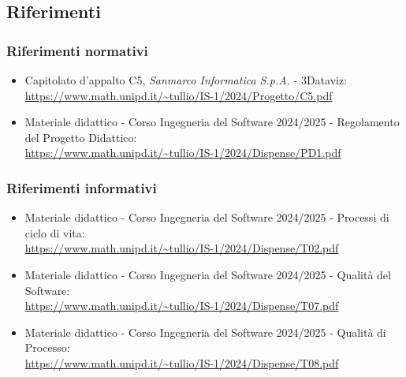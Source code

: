     \subsection{Riferimenti}
        \subsubsection{Riferimenti normativi}
        \begin{itemize}
            \item Capitolato d'appalto C5, \textit{Sanmarco Informatica S.p.A.} - 3Dataviz:  \\
            \url{https://www.math.unipd.it/~tullio/IS-1/2024/Progetto/C5.pdf}
            \item Materiale didattico - Corso Ingegneria del Software 2024/2025 - Regolamento del Progetto Didattico: \\ 
            \url{https://www.math.unipd.it/~tullio/IS-1/2024/Dispense/PD1.pdf}
        \end{itemize}

        \subsubsection{Riferimenti informativi}
        \begin{itemize}
            \item Materiale didattico - Corso Ingegneria del Software 2024/2025 - Processi di ciclo di vita:  \\
            \url{https://www.math.unipd.it/~tullio/IS-1/2024/Dispense/T02.pdf} 
            \item Materiale didattico - Corso Ingegneria del Software 2024/2025 - Qualità del Software: \\ 
            \url{https://www.math.unipd.it/~tullio/IS-1/2024/Dispense/T07.pdf} 
            \item Materiale didattico - Corso Ingegneria del Software 2024/2025 - Qualità di Processo:  \\
            \url{https://www.math.unipd.it/~tullio/IS-1/2024/Dispense/T08.pdf}
        \end{itemize}
